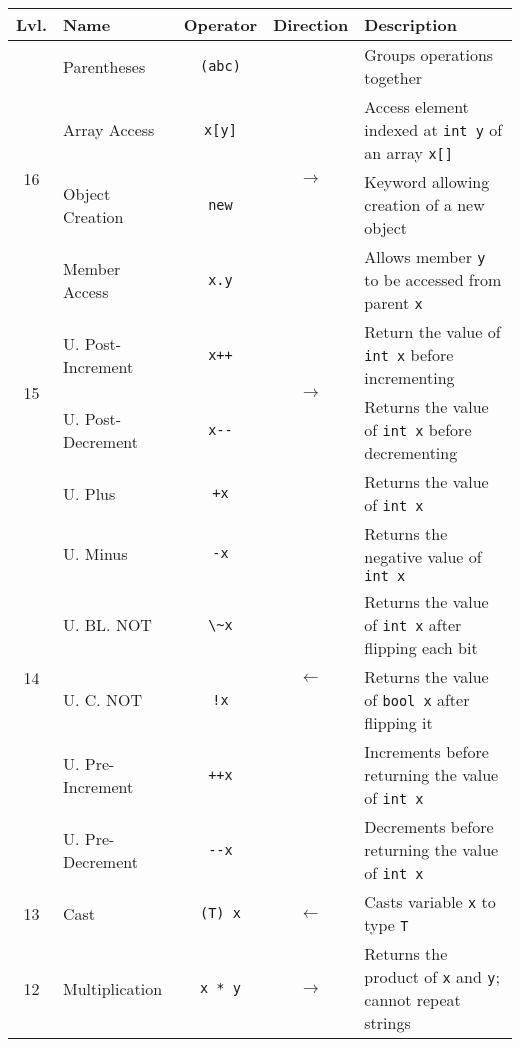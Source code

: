 \documentclass{article}
\begin{document}
\begin{center}\begin{tabularx}{\textwidth}{clccX}\toprule
  Lvl.                & \quad Name        & Operator          & Direction & \qquad Description \\\midrule
  \multirow{4}{*}{16} & Parentheses       & \lstinline|(abc)| & \multirow{4}{*}{\(\to\)}& Groups operations together\\
                      & Array Access      & \lstinline|x[y]|  & & Access element indexed at \lstinline|int y| of an array \lstinline|x[]|\\
                      & Object Creation   & \lstinline|new|   & & Keyword allowing creation of a new object\\
                      & Member Access     & \lstinline|x.y|   & & Allows member \lstinline|y| to be accessed from parent \lstinline|x| \\ \midrule
  \multirow{2}{*}{15} & U. Post-Increment & \lstinline|x++|   & \multirow{2}{*}{\(\to\)} & Return the value of \lstinline|int x| before incrementing \\
                      & U. Post-Decrement & \lstinline|x--|   & & Returns the value of \lstinline|int x| before decrementing\\\midrule
  \multirow{6}{*}{14} & U. Plus           & \lstinline|+x|    & \multirow{6}{*}{\(\gets\)} & Returns the value of \lstinline|int x|\\
                      & U. Minus          & \lstinline|-x|    & & Returns the negative value of \lstinline|int x| \\
                      & U. BL. NOT        & \lstinline|\~x|  & & Returns the value of \lstinline|int x| after flipping each bit\\
                      & U. C. NOT         & \lstinline|!x|    & & Returns the value of \lstinline|bool x| after flipping it \\
                      & U. Pre-Increment  & \lstinline|++x|   & & Increments before returning the value of \lstinline|int x| \\
                      & U. Pre-Decrement  & \lstinline|--x|   & & Decrements before returning the value of \lstinline|int x| \\\midrule
                  13  & Cast              & \lstinline|(T) x| & \(\gets\) & Casts variable \lstinline|x| to type \lstinline|T| \\\midrule
 \multirow{3}{*}{12}  & Multiplication    & \lstinline|x * y| & \multirow{3}{*}{\(\to\)} & Returns the product of \lstinline|x| and \lstinline|y|; cannot repeat strings\\

\end{tabularx}
\end{center}
\end{document}

